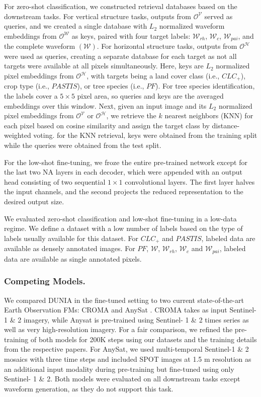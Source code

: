 For zero-shot classification, we constructed retrieval databases based on the downstream tasks. For vertical structure tasks, outputs from $\mathcal{O}^\mathcal{V}$ served as queries, and we created a single database with $L_2$ normalized waveform embeddings from $\mathcal{O}^\mathcal{W}$ as keys, paired with four target labels: $\mathcal{W}_{rh}$, $\mathcal{W}_c$, $\mathcal{W}_{pai}$, and the complete waveform $(\mathcal{W})$. For horizontal structure tasks, outputs from $\mathcal{O}^\mathcal{H}$ were used as queries, creating a separate database for each target as not all targets were available at all pixels simultaneously. Here, keys are $L_2$ normalized pixel embeddings from $\mathcal{O}^\mathcal{H}$, with targets being a land cover class (i.e., $CLC_+$), crop type (i.e., $PASTIS$), or tree species (i.e., $PF$). For tree species identification, the labels cover a $5 \times 5$ pixel area, so queries and keys are the averaged embeddings over this window. Next, given an input image and its $L_2$ normalized pixel embeddings from $\mathcal{O}^\mathcal{V}$ or $\mathcal{O}^\mathcal{H}$, we retrieve the $k$ nearest neighbors (KNN) for each pixel based on cosine similarity and assign the target class by distance-weighted voting. for the KNN retrieval, keys were obtained from the training split while the queries were obtained from the test split.  

For the low-shot fine-tuning, we froze the entire pre-trained network except for the last two NA layers in each decoder, which were appended with an output head consisting of two sequential $1 \times 1$ convolutional layers. The first layer halves the input channels, and the second projects the reduced representation to the desired output size.

We evaluated zero-shot classification and low-shot fine-tuning in a low-data regime. We define a dataset with a low number of labels based on the type of labels usually available for this dataset. For $CLC_+$ and $PASTIS$, labeled data are available as densely annotated images. For $PF$, $\mathcal{W}$, $\mathcal{W}_{rh}$, $\mathcal{W}_c$ and $\mathcal{W}_{pai}$, labeled data are available as single annotated pixels.

\subsubsection{Competing Models.} 
We compared DUNIA in the fine-tuned setting to two current state-of-the-art Earth Observation FMs: CROMA \cite{fuller2023croma} and AnySat \cite{astruc2024anysat}. CROMA takes as input Sentinel- 1 \& 2 imagery, while Anysat is pre-trained using Sentinel- 1 \& 2 times series as well as very high-resolution imagery. For a fair comparison, we refined the pre-training of both models for 200K steps using our datasets and the training details from the respective papers. For AnySat, we used multi-temporal Sentinel-1 \& 2 mosaics with three time steps and included SPOT images at 1.5 m resolution as an additional input modality during pre-training but fine-tuned using only Sentinel- 1 \& 2. Both models were evaluated on all downstream tasks except waveform generation, as they do not support this task.

